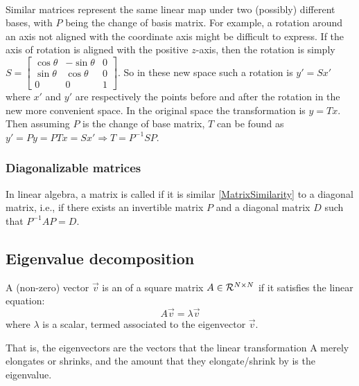 \paragraph{} Similar matrices represent the same linear map under two (possibly) different bases, with $P$ being the change of basis matrix. For example, a rotation around an axis not aligned with the coordinate axis might be difficult to express.  If the axis of rotation is aligned with the positive $z$-axis, then the rotation is simply $S =\begin{bmatrix}\cos \theta &-\sin \theta &0\\\sin \theta &\cos \theta &0\\0&0&1\end{bmatrix}$. So in these new space such a rotation is $y' = Sx'$ where $x'$ and $y'$ are respectively the points before and after the rotation in the new more convenient space. 
In the original space the transformation is $y = Tx$. Then assuming $P$ is the change of base matrix, $T$ can be found as $y' = P y = PTx= S x' \Rightarrow T = P^{-1} S P$.

\subsubsection{Diagonalizable matrices}
\begin{definition}{} In linear algebra, a matrix is called  if it is similar \autoref{MatrixSimilarity} to a diagonal matrix, i.e., if there exists an invertible matrix $P$ and a diagonal matrix $D$ such that $P^{-1}AP =D$.
\end{definition}

\subsection{Eigenvalue decomposition}
\begin{definition}{}
A (non-zero) vector $\vec{v}$ is an  of a square matrix $A \in \CMcal{R}^{N\times N}$ if it satisfies the linear equation:
\begin{equation}
A\vec{v} = \lambda \vec{v}
\label{eigenvector}
\end{equation}
where $\lambda$ is a scalar, termed  associated to the eigenvector $\vec{v}$. 
\end{definition}
That is, the eigenvectors are the vectors that the linear transformation A merely elongates or shrinks, and the amount that they elongate/shrink by is the eigenvalue.

